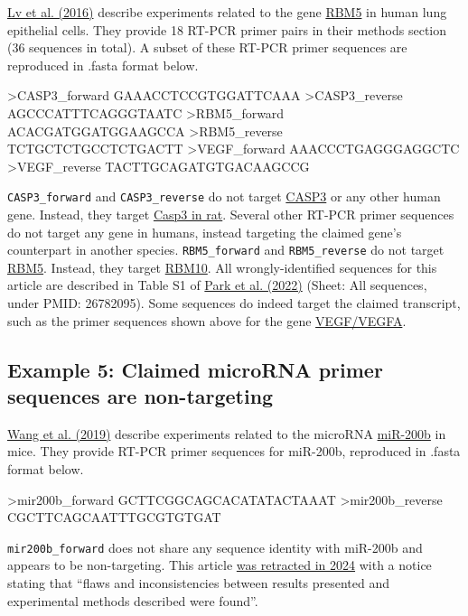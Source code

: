 \documentclass[letterpaper, 12pt]{article}
\begin{document}
\href{https://doi.org/10.3892/or.2016.4551}{Lv et al. (2016)} describe experiments related to the gene \href{https://www.ncbi.nlm.nih.gov/gene/10181}{RBM5} in human lung epithelial cells. They provide 18 RT-PCR primer pairs in their methods section (36 sequences in total). A subset of these RT-PCR primer sequences are reproduced in .fasta format below.

\begin{verbatim*}
>CASP3_forward
GAAACCTCCGTGGATTCAAA
>CASP3_reverse
AGCCCATTTCAGGGTAATC
>RBM5_forward
ACACGATGGATGGAAGCCA
>RBM5_reverse
TCTGCTCTGCCTCTGACTT
>VEGF_forward
AAACCCTGAGGGAGGCTC
>VEGF_reverse
TACTTGCAGATGTGACAAGCCG
\end{verbatim*}

\verb|CASP3_forward| and \verb|CASP3_reverse| do not target \href{https://www.ncbi.nlm.nih.gov/gene/836}{CASP3} or any other human gene. Instead, they target \href{https://www.ncbi.nlm.nih.gov/gene/25402}{Casp3 in rat}. Several other RT-PCR primer sequences do not target any gene in humans, instead targeting the claimed gene's counterpart in another species. \verb|RBM5_forward| and \verb|RBM5_reverse| do not target \href{https://www.ncbi.nlm.nih.gov/gene/10181}{RBM5}. Instead, they target \href{https://www.ncbi.nlm.nih.gov/gene/8241}{RBM10}. All wrongly-identified sequences for this article are described in Table S1 of \href{https://doi.org/10.26508/lsa.202101203}{Park et al. (2022)} (Sheet: All sequences, under PMID: 26782095). Some sequences do indeed target the claimed transcript, such as the primer sequences shown above for the gene \href{https://www.ncbi.nlm.nih.gov/gene/7422}{VEGF/VEGFA}.

\subsection*{Example 5: Claimed microRNA primer sequences are non-targeting}

\href{}{Wang et al. (2019)} describe experiments related to the microRNA \href{https://www.ncbi.nlm.nih.gov/gene/387243}{miR-200b} in mice. They provide RT-PCR primer sequences for miR-200b, reproduced in .fasta format below.

\begin{verbatim*}
>mir200b_forward
GCTTCGGCAGCACATATACTAAAT
>mir200b_reverse
CGCTTCAGCAATTTGCGTGTGAT
\end{verbatim*}

\verb|mir200b_forward| does not share any sequence identity with miR-200b and appears to be non-targeting. This article \href{https://doi.org/10.1002/jcb.30555}{was retracted in 2024} with a notice stating that ``flaws and inconsistencies between results presented and experimental methods described were found''.
\end{document}
